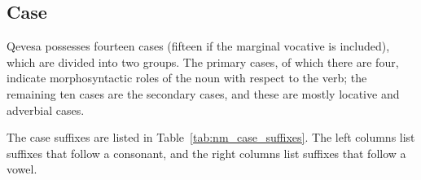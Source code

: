 \documentclass[grammar]{subfiles}
\begin{document}
%

  \subsection{Case}
  \label{ssec:nm_case}

  Qevesa possesses fourteen cases (fifteen if the marginal vocative is
  included), which are divided into two groups.  The primary cases, of which
  there are four, indicate morphosyntactic roles of the noun with respect to
  the verb; the remaining ten cases are the secondary cases, and these are
  mostly locative and adverbial cases. 

  The case suffixes are listed in Table~\ref{tab:nm_case_suffixes}.  The left
  columns list suffixes that follow a consonant, and the right columns list
  suffixes that follow a vowel.  
\end{document}
